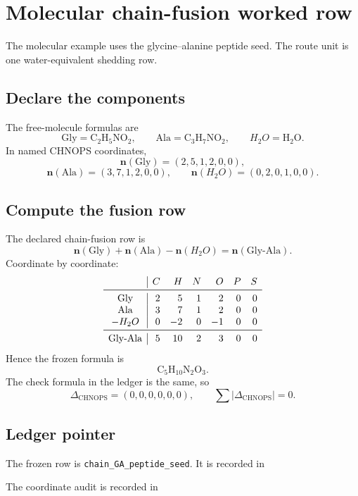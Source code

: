 \section{Molecular chain-fusion worked row}

The molecular example uses the glycine--alanine peptide seed. The route unit is one water-equivalent shedding row.

\subsection{Declare the components}

The free-molecule formulas are
\[
\mathrm{Gly}=\mathrm{C}_2\mathrm{H}_5\mathrm{N}\mathrm{O}_2,
\qquad
\mathrm{Ala}=\mathrm{C}_3\mathrm{H}_7\mathrm{N}\mathrm{O}_2,
\qquad
H_2O=\mathrm{H}_2\mathrm{O}.
\]
In named CHNOPS coordinates,
\[
\mathbf n(\mathrm{Gly})=(2,5,1,2,0,0),
\]
\[
\mathbf n(\mathrm{Ala})=(3,7,1,2,0,0),
\qquad
\mathbf n(H_2O)=(0,2,0,1,0,0).
\]

\subsection{Compute the fusion row}

The declared chain-fusion row is
\[
\boxed{\mathbf n(\mathrm{Gly})+\mathbf n(\mathrm{Ala})-\mathbf n(H_2O)=\mathbf n(\mathrm{Gly\mbox{-}Ala}).}
\]
Coordinate by coordinate:
\[
\begin{array}{c|rrrrrr}
 & C&H&N&O&P&S\\
\midrule
\mathrm{Gly} & 2&5&1&2&0&0\\
\mathrm{Ala} & 3&7&1&2&0&0\\
-H_2O & 0&-2&0&-1&0&0\\
\midrule
\mathrm{Gly\mbox{-}Ala} & 5&10&2&3&0&0
\end{array}
\]
Hence the frozen formula is
\[
\mathrm{C}_5\mathrm{H}_{10}\mathrm{N}_2\mathrm{O}_3.
\]
The check formula in the ledger is the same, so
\[
\Delta_{\mathrm{CHNOPS}}=(0,0,0,0,0,0),
\qquad
\sum |\Delta_{\mathrm{CHNOPS}}|=0.
\]

\subsection{Ledger pointer}

The frozen row is \texttt{chain\_GA\_peptide\_seed}. It is recorded in
\begin{center}
\small{}
\end{center}
The coordinate audit is recorded in
\begin{center}
\small{}
\end{center}
